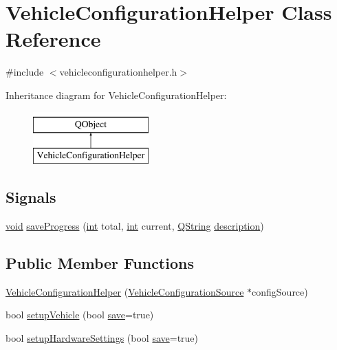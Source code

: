 \hypertarget{class_vehicle_configuration_helper}{\section{Vehicle\-Configuration\-Helper Class Reference}
\label{class_vehicle_configuration_helper}
}


{\ttfamily \#include $<$vehicleconfigurationhelper.\-h$>$}

Inheritance diagram for Vehicle\-Configuration\-Helper\-:\begin{figure}[H]
\begin{center}
\leavevmode
\includegraphics[height=2.000000cm]{class_vehicle_configuration_helper}
\end{center}
\end{figure}
\subsection*{Signals}
\begin{DoxyCompactItemize}
\item 
\hyperlink{group___u_a_v_objects_plugin_ga444cf2ff3f0ecbe028adce838d373f5c}{void} \hyperlink{group___vehicle_configuration_helper_ga7ec52f13c4dee3a474698106c2ca3bf4}{save\-Progress} (\hyperlink{ioapi_8h_a787fa3cf048117ba7123753c1e74fcd6}{int} total, \hyperlink{ioapi_8h_a787fa3cf048117ba7123753c1e74fcd6}{int} current, \hyperlink{group___u_a_v_objects_plugin_gab9d252f49c333c94a72f97ce3105a32d}{Q\-String} \hyperlink{sdlgamepad_8dox_ae82208d022e4246ddf1e4f481a3f81b0}{description})
\end{DoxyCompactItemize}
\subsection*{Public Member Functions}
\begin{DoxyCompactItemize}
\item 
\hyperlink{group___vehicle_configuration_helper_ga8d0681e69a65e5d227b2255abe8bb982}{Vehicle\-Configuration\-Helper} (\hyperlink{class_vehicle_configuration_source}{Vehicle\-Configuration\-Source} $\ast$config\-Source)
\item 
bool \hyperlink{group___vehicle_configuration_helper_gaa307534a6b38e5b7e67060bc8d381b09}{setup\-Vehicle} (bool \hyperlink{uavobjecttemplate_8m_a79178933c5b76091ca04178d14a5ba98}{save}=true)
\item 
bool \hyperlink{group___vehicle_configuration_helper_ga2762da9776a1c2608786cb7b1ff6ca6c}{setup\-Hardware\-Settings} (bool \hyperlink{uavobjecttemplate_8m_a79178933c5b76091ca04178d14a5ba98}{save}=true)
\end{DoxyCompactItemize}
